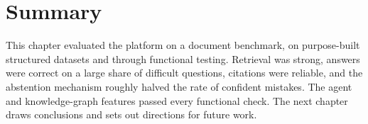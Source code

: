 \section{Summary}

This chapter evaluated the platform on a document benchmark, on purpose-built
structured datasets and through functional testing. Retrieval was strong, answers
were correct on a large share of difficult questions, citations were reliable, and
the abstention mechanism roughly halved the rate of confident mistakes. The agent
and knowledge-graph features passed every functional check. The next chapter draws
conclusions and sets out directions for future work.
